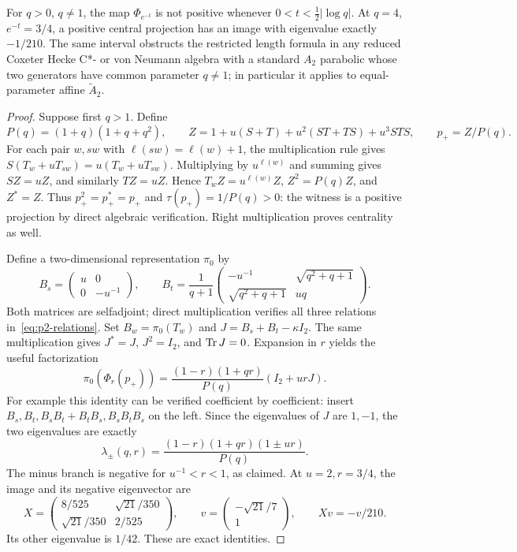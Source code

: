 \begin{theorem}\label{thm:p2-obstruction}
For $q>0$, $q\ne1$, the map $\Phi_{e^{-t}}$ is not positive whenever
$0<t<\frac12|\log q|$. At $q=4$, $e^{-t}=3/4$, a positive central
projection has an image with eigenvalue exactly $-1/210$.
The same interval obstructs the restricted length formula in any reduced
Coxeter Hecke C*- or von Neumann algebra with a standard $A_2$ parabolic
whose two generators have common parameter $q\ne1$; in particular it
applies to equal-parameter affine $\widetilde A_2$.
\end{theorem}
\begin{proof}
Suppose first $q>1$. Define
\[
 P(q)=(1+q)(1+q+q^2),\qquad
 Z=1+u(S+T)+u^2(ST+TS)+u^3STS,\qquad p_+=Z/P(q).
\]
For each pair $w,sw$ with $\ell(sw)=\ell(w)+1$, the multiplication rule
gives $S(T_w+uT_{sw})=u(T_w+uT_{sw})$. Multiplying by $u^{\ell(w)}$
and summing gives $SZ=uZ$, and similarly $TZ=uZ$. Hence
$T_wZ=u^{\ell(w)}Z$, $Z^2=P(q)Z$, and $Z^*=Z$. Thus $p_+^2=p_+^*=p_+$
and $\tau(p_+)=1/P(q)>0$: the witness is a positive projection by direct
algebraic verification. Right multiplication proves centrality as well.

Define a two-dimensional representation $\pi_0$ by
\begin{equation}\label{eq:p2-matrices}
 B_s=\begin{pmatrix}u&0\\0&-u^{-1}\end{pmatrix},\qquad
 B_t=\frac1{q+1}\begin{pmatrix}-u^{-1}&\sqrt{q^2+q+1}\\
                  \sqrt{q^2+q+1}&uq\end{pmatrix}.
\end{equation}
Both matrices are selfadjoint; direct multiplication verifies all three
relations in~\eqref{eq:p2-relations}. Set $B_w=\pi_0(T_w)$ and
$J=B_s+B_t-\kappa I_2$. The same multiplication gives
$J^*=J$, $J^2=I_2$, and $\operatorname{Tr} J=0$. Expansion in $r$ yields the useful
factorization
\begin{equation}\label{eq:p2-witness-factor}
 \pi_0(\Phi_r(p_+))=
 \frac{(1-r)(1+qr)}{P(q)}(I_2+urJ).
\end{equation}
For example this identity can be verified coefficient by coefficient:
insert $B_s,B_t,B_sB_t+B_tB_s,B_sB_tB_s$ on the left. Since the eigenvalues
of $J$ are $1,-1$, the two eigenvalues are exactly
\[
 \lambda_\pm(q,r)=\frac{(1-r)(1+qr)(1\pm ur)}{P(q)}.
\]
The minus branch is negative for $u^{-1}<r<1$, as claimed.
At $u=2,r=3/4$, the image and its negative eigenvector are
\[
 X=\begin{pmatrix}8/525&\sqrt{21}/350\\\sqrt{21}/350&2/525\end{pmatrix},
 \qquad v=\begin{pmatrix}-\sqrt{21}/7\\1\end{pmatrix},
 \qquad Xv=-v/210.
\]
Its other eigenvalue is $1/42$. These are exact identities.


\end{proof}
